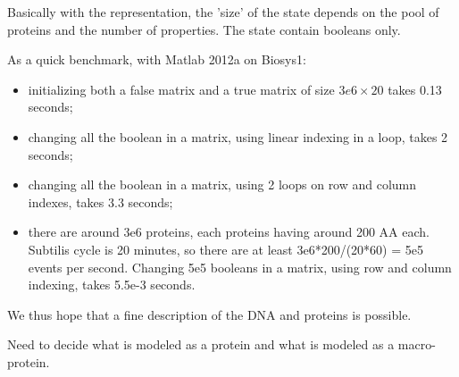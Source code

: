 Basically with the representation, the 'size' of the state depends on the pool of proteins and the number of properties. The state contain booleans only.

\medskip

As a quick benchmark, with Matlab 2012a on Biosys1:
\begin{itemize}
  \item initializing both a false matrix and a true matrix of size $3e6 \times 20$ takes 0.13 seconds;
  \item changing all the boolean in a matrix, using linear indexing in a loop, takes 2 seconds;
  \item changing all the boolean in a matrix, using 2 loops on row and column indexes, takes 3.3 seconds;
  \item there are around 3e6 proteins, each proteins having around 200 AA each. Subtilis cycle is 20 minutes, so there are at least 3e6*200/(20*60) = 5e5 events per second. Changing 5e5 booleans in a matrix, using row and column indexing, takes 5.5e-3 seconds.
\end{itemize}
We thus hope that a fine description of the DNA and proteins is possible.

\medskip

\textcolor[rgb]{1.00,0.00,0.00}{Need to decide what is modeled as a protein and what is modeled as a macro-protein.}


